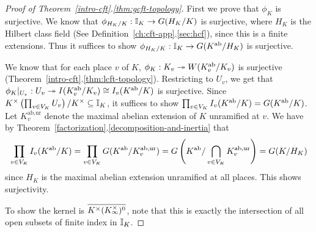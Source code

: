 \begin{proof}[Proof of Theorem~\ref{intro-cft}.\ref{thm:gcft-topology}]
%
First we prove that $\phi_K$ is surjective. We know that $\phi_{H_K/K}:\mathbb{I}_K\to G(H_K/K)$ is surjective, where $H_K$ is the Hilbert class field (See Definition~\ref{ch:cft-app}.\ref{sec:hcf}), since this is a finite extensions. Thus it suffices to show $\phi_{H_K/K}:\mathbb{I}_K\to G(K^{\text{ab}}/H_K)$ is surjective.

We know that for each place $v$ of $K$, $\phi_K:K_v\twoheadrightarrow W(K_v^{\text{ab}}/K_v)$ is surjective (Theorem~\ref{intro-cft}.\ref{thm:lcft-topology}). Restricting to $U_v$, we get that $\phi_K|_{U_v}:U_v\twoheadrightarrow I(K_v^{\text{ab}}/K_v)\cong I_v(K^{\text{ab}}/K)$ is surjective. %
Since $K^{\times}\left( {\prod_{v\in V_K} U_v} \right)/K^{\times}\subseteq \mathbb{I}_K$, it suffices to show $\prod_{v\in V_K} I_v(K^{\text{ab}}/K)=G(K^{\text{ab}}/K)$. Let $K^{\text{ab,ur}}_v$ denote the maximal abelian extension of $K$ unramified at $v$. We have by Theorem~\ref{factorization}.\ref{decomposition-and-inertia} that
\[
\prod_{v\in V_K} I_v(K^{\text{ab}}/K)=\prod_{v\in V_K} G(K^{\text{ab}}/K^{\text{ab,ur}}_v)=G\left( {K^{\text{ab}}/\bigcap_{v\in V_K} K^{\text{ab,ur}}_v} \right)=G(K/H_K)
\]
since $H_K$ is the maximal abelian extension unramified at all places. This shows surjectivity.

To show the kernel is $\overline{K^{\times}(K^{\times}_{\infty})^0}$, note that this is exactly the intersection of all open subsets of finite index in $\mathbb{I}_K$. 
\end{proof}
